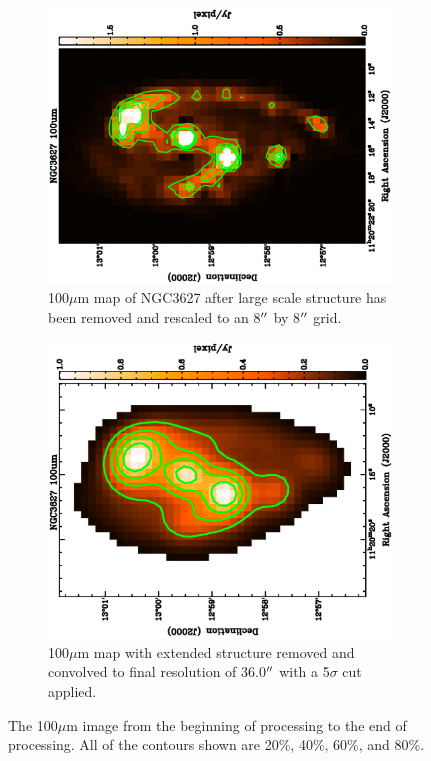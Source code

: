 \begin{figure}
  \begin{subfigure}[t]{.45\textwidth}
    \centering
    \includegraphics[width=1.\textwidth,angle=270]{obs_imgs/100_rem.eps}
    \caption{100$\mu$m map of NGC3627 after large scale structure has been removed and rescaled to an 8$\mbox{$^{\prime\prime}$}$ by 8$\mbox{$^{\prime\prime}$}$ grid.}
  \end{subfigure}%
  \quad
  \begin{subfigure}[t]{0.45\textwidth}
    \centering
    \includegraphics[width=1.\textwidth,angle=270]{obs_imgs/100_sed_use.eps}
    \caption[100$\mu$m Filtering Steps]{100$\mu$m map with extended structure removed and convolved to final resolution of 36.0$\mbox{$^{\prime\prime}$}$ with a 5$\sigma$ cut applied.}
  \end{subfigure}
  \caption[100$\mu$m Filtering Steps]{The 100$\mu$m image from the beginning of processing to the end of processing.  All of the contours shown are 20\%, 40\%, 60\%, and 80\%.}
  \label{fig_100_transform}
\end{figure}
  

